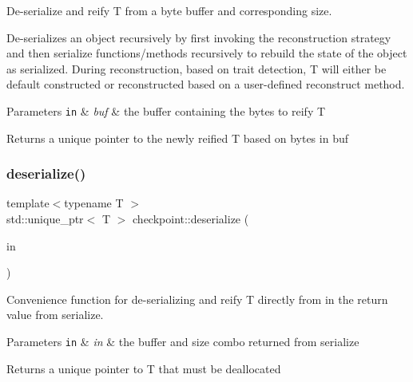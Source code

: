 De-\/serialize and reify {\ttfamily T} from a byte buffer and corresponding {\ttfamily size}. 

De-\/serializes an object recursively by first invoking the reconstruction strategy and then {\ttfamily serialize} functions/methods recursively to rebuild the state of the object as serialized. During reconstruction, based on trait detection, {\ttfamily T} will either be default constructed or reconstructed based on a user-\/defined reconstruct method.


\begin{DoxyParams}[1]{Parameters}
\mbox{\tt in}  & {\em buf} & the buffer containing the bytes to reify {\ttfamily T} \\
\hline
\end{DoxyParams}
\begin{DoxyReturn}{Returns}
a unique pointer to the newly reified {\ttfamily T} based on bytes in {\ttfamily buf} 
\end{DoxyReturn}
\mbox{\label{namespacecheckpoint_a1fa5c2e70f11308a1a94b163924d88f3}} 
\subsubsection{\texorpdfstring{deserialize()}{deserialize()}\hspace{0.1cm}{\footnotesize\ttfamily [3/3]}}
{\footnotesize\ttfamily template$<$typename T $>$ \\
std\+::unique\+\_\+ptr$<$ T $>$ checkpoint\+::deserialize (\begin{DoxyParamCaption}\item[{\hyperlink{namespacecheckpoint_aa61e2b491f405a63a394f9aad528c37a}{Serialized\+Return\+Type} \&\&}]{in }\end{DoxyParamCaption})}



Convenience function for de-\/serializing and reify {\ttfamily T} directly from {\ttfamily in} the return value from {\ttfamily serialize}. 


\begin{DoxyParams}[1]{Parameters}
\mbox{\tt in}  & {\em in} & the buffer and size combo returned from {\ttfamily serialize} \\
\hline
\end{DoxyParams}
\begin{DoxyReturn}{Returns}
a unique pointer to {\ttfamily T} that must be deallocated 
\end{DoxyReturn}
\mbox{\label{namespacecheckpoint_a917aafbf9658a63360e4d5997a3e09ea}} 
